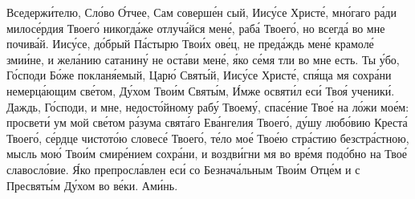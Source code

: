 \begin{mymulticols}
Вседерж\'{и}телю, Сл\'{о}во \'{О}тчее, Сам соверш\'{е}н сый, Иис\'{у}се Христ\'{е}, мн\'{о}гаго р\'{а}ди милос\'{е}рдия Твоег\'{о} никогд\'{а}же отлуч\'{а}йся мен\'{е}, раб\'{а} Твоег\'{о}, но всегд\'{а} во мне почив\'{а}й. Иис\'{у}се, д\'{о}брый П\'{а}стырю Тво\'{и}х ов\'{е}ц, не пред\'{а}ждь мен\'{е} крамол\'{е} зми\'{и}не, и жел\'{а}нию сатанин\'{у} не ост\'{а}ви мен\'{е}, \'{я}ко с\'{е}мя тли во мне есть. Ты \'{у}бо, Г\'{о}споди Б\'{о}же поклан\'{я}емый, Цар\'{ю} Свят\'{ы}й, Иис\'{у}се Христ\'{е}, сп\'{я}ща мя сохр\'{а}ни немерц\'{а}ющим св\'{е}том, Д\'{у}хом Тво\'{и}м Свят\'{ы}м, \'{И}мже освят\'{и}л ес\'{и} Тво\'{я} ученик\'{и}. Даждь, Г\'{о}споди, и мне, недост\'{о}йному раб\'{у} Твоем\'{у}, спас\'{е}ние Тво\'{е} на л\'{о}жи мо\'{е}м: просвет\'{и} ум мой св\'{е}том р\'{а}зума свят\'{а}го Ев\'{а}нгелия Твоег\'{о}, д\'{у}шу люб\'{о}вию Крест\'{а} Твоег\'{о}, с\'{е}рдце чистот\'{о}ю словес\'{е} Твоег\'{о}, т\'{е}ло мо\'{е} Тво\'{е}ю стр\'{а}стию безстр\'{а}стною, мысль мо\'{ю} Тво\'{и}м смир\'{е}нием сохр\'{а}ни, и воздв\'{и}гни мя во вр\'{е}мя под\'{о}бно на Тво\'{е} славосл\'{о}вие. \'{Я}ко препросл\'{а}влен ес\'{и} со Безнач\'{а}льным Тво\'{и}м Отц\'{е}м и с Пресвят\'{ы}м Д\'{у}хом во в\'{е}ки. Ам\'{и}нь.



\end{mymulticols}
